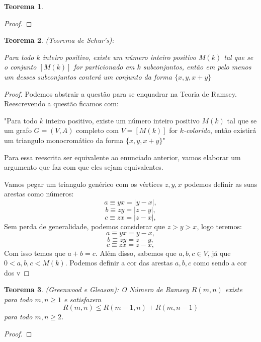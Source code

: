 \documentclass{article}
\newtheorem{teor}{Teorema}[section]
\begin{document}
\begin{teor}
\end{teor}

\begin{proof}
\end{proof}


\begin{teor}
    (Teorema de Schur’s):

    Para todo $k$ inteiro positivo, existe um número inteiro positivo $M(k)$ tal que se o conjunto $[M(k)]$ for particionado em $k$ subconjuntos, então em pelo menos um desses subconjuntos conterá um conjunto da forma $\{x, y, x+y\}$
\end{teor}

\begin{proof}
    Podemos abstrair a questão para se enquadrar na Teoria de Ramsey. Reescrevendo a questão ficamos com:

    "Para todo $k$ inteiro positivo, existe um número inteiro positivo $M(k)$ tal que se um grafo $G = (V, A)$ completo com $V = [M(k)]$ for $k$\emph{-colorido}, então existirá um triangulo monocromático da forma $\{x, y, x+y\}$"

    Para essa reescrita ser equivalente ao enunciado anterior, vamos elaborar um argumento que faz com que eles sejam equivalentes.

    Vamos pegar um triangulo genérico com os vértices $z, y, x$ podemos definir as suas arestas como números:
    \[a \equiv yx = |y-x|,\]
    \[b \equiv zy = |z-y|,\]
    \[c \equiv zx = |z-x|,\]
    Sem perda de generalidade, podemos considerar que $z > y > x$, logo teremos:
    \[a \equiv yx = y-x,\]
    \[b \equiv zy = z-y,\]
    \[c \equiv zx = z-x,\]
    Com isso temos que $a + b = c$.
    Além disso, sabemos que $a, b, c \in V$, já que $0 < a, b, c < M(k)$. Podemos definir a cor das arestas $a,b,c$ como sendo a cor dos v
\end{proof}


\begin{teor}
    (Greenwood e Gleason):
    O Número de Ramsey  $R(m, n)$ existe para todo $m,n \geq 1$ e satisfazem
    \[R(m, n) \leq R(m-1, n) + R(m, n-1)\]
    para todo $m,n \geq 2$.
\end{teor}

\begin{proof}

\end{proof}
\end{document}
